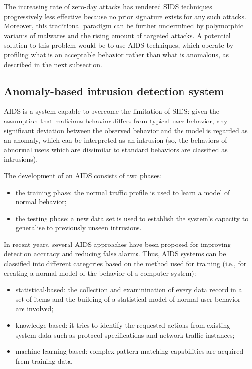 The increasing rate of zero-day attacks\parencite{Symantec} has rendered SIDS techniques progressively less effective because no prior signature exists for any such attacks.
Moreover, this traditional paradigm can be further undermined by polymorphic variants of malwares and the rising amount of targeted attacks.
A potential solution to this problem would be to use AIDS techniques, which operate by profiling what is an acceptable behavior rather than what is anomalous, as described in the next subsection.

\subsection{Anomaly-based intrusion detection system}
AIDS is a system capable to overcome the limitation of SIDS: given the assumption that malicious behavior differs from typical user behavior, any significant deviation between the observed behavior and the model is regarded as an anomaly, which can be interpreted as an intrusion (so, the behaviors of abnormal users which are dissimilar to standard behaviors are classified as intrusions).

The development of an AIDS consists of two phases:
\begin{itemize}
    \item the training phase: the normal traffic profile is used to learn a model of normal behavior;
    \item the testing phase: a new data set is used to establish the system’s capacity to generalise to previously unseen intrusions.
\end{itemize}


In recent years, several AIDS approaches have been proposed for improving detection accuracy and reducing false alarms.
Thus, AIDS systems can be classified into different categories based on the method used for training (i.e., for creating a normal model of the behavior of a computer system):
\begin{itemize}
    \item statistical-based: the collection and examinination of every data record in a set of items and the building of a statistical model of normal user behavior are involved;
    \item knowledge-based: it tries to identify the requested actions from existing system data such as protocol specifications and network traffic instances;
    \item machine learning-based: complex pattern-matching capabilities are acquired from training data.
\end{itemize}

